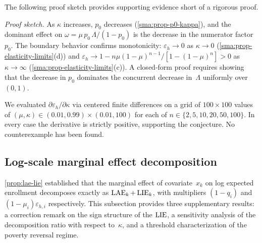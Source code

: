 The following proof sketch provides supporting evidence short of a rigorous proof.

\medskip\noindent\textit{Proof sketch.}\enspace
As $\kappa$ increases, $p_0$ decreases (\cref{sma:prop-p0-kappa}),
and the dominant effect on $\omega = \mu\,p_0\,\Lambda/(1-p_0)$ is the
decrease in the numerator factor~$p_0$.
The boundary behavior confirms monotonicity:
$\varepsilon_h \to 0$ as $\kappa \to 0$
(\cref{sma:prop-elasticity-limits}(d)) and
$\varepsilon_h \to 1 - n\mu(1-\mu)^{n-1}/[1-(1-\mu)^n] > 0$ as
$\kappa \to \infty$ (\cref{sma:prop-elasticity-limits}(c)).
A closed-form proof requires showing that the decrease in $p_0$ dominates
the concurrent decrease in~$\Lambda$ uniformly over $(0,1)$.

\begin{remark}
  \label{sma:rem-conj-numerical}
  We evaluated $\partial\varepsilon_h/\partial\kappa$ via centered
  finite differences on a grid of $100 \times 100$ values of
  $(\mu,\kappa) \in (0.01, 0.99) \times (0.01, 100)$ for each of
  $n \in \{2, 5, 10, 20, 50, 100\}$. In every case the derivative is
  strictly positive, supporting the conjecture. No counterexample has been
  found.
\end{remark}


\subsection{Log-scale marginal effect decomposition}\label{sma:logdecomp}

\cref{prop:lae-lie} established that the marginal effect of covariate~$x_k$
on log expected enrollment decomposes exactly as $\operatorname{LAE}_k + \operatorname{LIE}_k$,
with multipliers $(1-q_i)$ and $(1-\mu_i)\varepsilon_{h,i}$ respectively.
This subsection provides three supplementary results: a correction remark
on the sign structure of the $\operatorname{LIE}$, a sensitivity analysis of the
decomposition ratio with respect to~$\kappa$, and a threshold
characterization of the poverty reversal regime.


